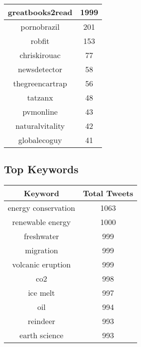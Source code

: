 \documentclass{article}\usepackage[T1]{fontenc}
\begin{document}
\begin{tabular}{|c|c|}
 \hline
greatbooks2read & 1999\\ 
 \hline
pornobrazil & 201\\ 
 \hline
robfit & 153\\ 
 \hline
chriskirouac & 77\\ 
 \hline
newsdetector & 58\\ 
 \hline
thegreencartrap & 56\\ 
 \hline
tatzanx & 48\\ 
 \hline
pvmonline & 43\\ 
 \hline
naturalvitality & 42\\ 
 \hline
globalecoguy & 41\\ 
 \hline
\end{tabular}\subsection*{Top Keywords}\begin{tabular}{|c|c|}         \hline         Keyword & Total Tweets \\ 
 \hline
energy conservation & 1063\\ 
 \hline
renewable energy & 1000\\ 
 \hline
freshwater & 999\\ 
 \hline
migration & 999\\ 
 \hline
volcanic eruption & 999\\ 
 \hline
co2 & 998\\ 
 \hline
ice melt & 997\\ 
 \hline
oil & 994\\ 
 \hline
reindeer & 993\\ 
 \hline
earth science & 993\\ 
 \hline
\end{tabular}
\end{document}
